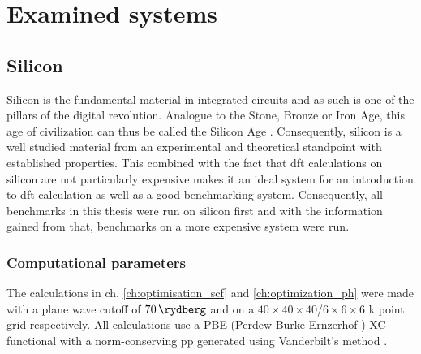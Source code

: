 \documentclass[main.tex]{subfiles}
\begin{document}
\chapter{Examined systems}\label{ch:examined_systems}

\section{Silicon}\label{sec:systems_silicon}

Silicon is the fundamental material in integrated circuits and as such is one of the pillars of the digital revolution.
Analogue to the Stone, Bronze or Iron Age, this age of civilization can thus be called the Silicon Age \cite{chabal_fundamental_2001}.
Consequently, silicon is a well studied material from an experimental and theoretical standpoint with established properties.
This combined with the fact that \acrshort{dft} calculations on silicon are not particularly expensive makes it an ideal system for an introduction to \acrshort{dft} calculation as well as a good benchmarking system.
Consequently, all benchmarks in this thesis were run on silicon first and with the information gained from that, benchmarks on a more expensive system were run.



\subsection{Computational parameters}

The calculations in ch. \ref{ch:optimisation_scf} and \ref{ch:optimization_ph} were made with a plane wave cutoff of \(\SI{70}{\rydberg}\) and on a \(40\times40\times40\)/\(6\times6\times6\) k point grid respectively.
All calculations use a PBE (Perdew-Burke-Ernzerhof \cite{perdew_generalized_1996}) XC-functional with a norm-conserving \acrshort{pp} generated using Vanderbilt's method \cite{hamann_erratum_2017}.

\section{\TaS}\label{sec:systems_tas2}
\end{document}
